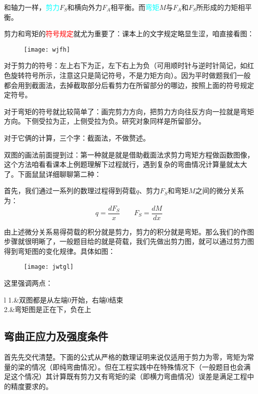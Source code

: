 \documentclass[10pt,a4paper]{ctexart}
\begin{document}
和轴力一样，\textcolor{cyan}{剪力}$F_S$和横向外力$F_A$相平衡。而\textcolor{cyan}{弯矩}$M$与$F_A$和$F_S$所形成的力矩相平衡。

剪力和弯矩的\textcolor{red}{符号规定}就尤为重要了：课本上的文字规定略显生涩，咱直接看图：

\begin{figure}[htp]%
	\centering
	\texttt{[image: wjfh]}
\end{figure}

对于剪力的符号：左上右下为正，左下右上为负（可用顺时针与逆时针简记，如红色旋转符号所示，注意这只是简记符号，不是力矩方向）。因为平时做题我们一般都会用到截面法，去掉截取部分后看剪力在所留部分的哪边，按照上面的符号规定定符号。

对于弯矩的符号就比较简单了：画完剪力方向，把剪力方向往反方向一拉就是弯矩方向。下侧受拉为正，上侧受拉为负。研究对象同样是所留部分。

对于它俩的计算，三个字：截面法，不做赘述。

双图的画法前面提到过：第一种就是就是借助截面法求剪力弯矩方程做函数图像，这个方法咱看看课本上例题理解下过程就行，遇到复杂的弯曲情况计算量就太大了。下面鼠鼠详细聊聊第二种：

首先，我们通过一系列的数理过程得到荷载$q$、剪力$F_S$和弯矩$M$之间的微分关系为：
\begin{equation}
	q=\frac{dF_S}{x} \qquad F_S=\frac{dM}{dx}
\end{equation}

由上述微分关系易得荷载的积分就是剪力，剪力的积分就是弯矩。那么我们的作图步骤就很明晰了，一般题目给的就是荷载，我们先做出剪力图，就可以通过剪力图得到弯矩图的变化规律。具体如图：
\begin{figure}[htp]%
	\centering
	\texttt{[image: jwtgl]}
\end{figure}

这里强调两点：

\begin{tblr}{l}
	1.&双图都是从左端0开始，右端0结束\\
	2.&弯矩图是正在下，负在上
\end{tblr}

\subsection{弯曲正应力及强度条件}
首先先交代清楚。下面的公式从严格的数理证明来说仅适用于剪力为零，弯矩为常量的梁的情况（即纯弯曲情况）。但在工程实践中在特殊情况下（一般题目也会满足这个情况）其计算既有剪力又有弯矩的梁（即横力弯曲情况）误差是满足工程中的精度要求的。
\end{document}
